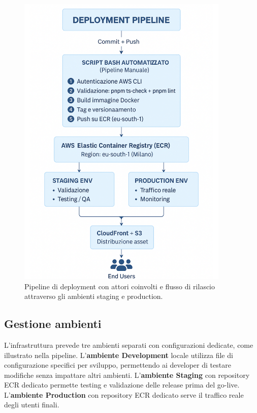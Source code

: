 \begin{figure}[h!]
    \centering
    \includegraphics[width=0.9\textwidth]{chapters/figures/aws.pdf}
    \caption{Pipeline di deployment con attori coinvolti e flusso di rilascio 
    attraverso gli ambienti staging e production.}
    \label{fig:deployment-pipeline}
\end{figure}
\clearpage

\subsection{Gestione ambienti}

L'infrastruttura prevede tre ambienti separati con configurazioni dedicate, 
come illustrato nella pipeline. L'\textbf{ambiente Development} locale utilizza 
file di configurazione specifici per sviluppo, permettendo ai developer di testare 
modifiche senza impattare altri ambienti. L'\textbf{ambiente Staging} con repository 
ECR dedicato permette testing e validazione delle release prima del go-live. 
L'\textbf{ambiente Production} con repository ECR dedicato serve il traffico 
reale degli utenti finali.

